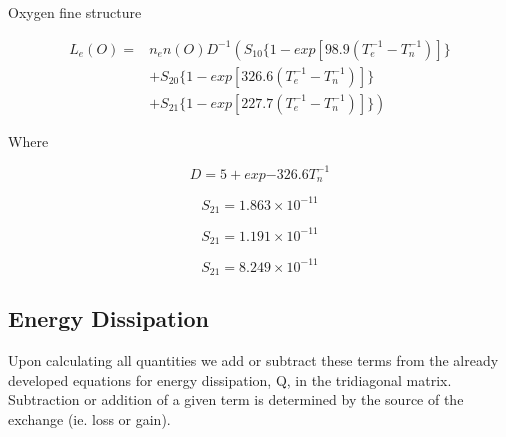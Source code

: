 \documentclass[10pt]{article}
\begin{document}
\noindent Oxygen fine structure 

\begin{equation}
\begin{split}
L_{e}(O) =& n_{e} n(O) D^{-1} \left( S_{10} \lbrace 1 - exp{[98.9(T_{e}^{-1} - T_{n}^{-1})]} \rbrace \right. \\ & \left. 
+ S_{20} \lbrace 1 - exp[326.6(T_{e}^{-1} - T_{n}^{-1})] \rbrace \right. \\ & \left. 
+ S_{21} \lbrace 1-exp[227.7(T_{e}^{-1} - T_{n}^{-1})] \rbrace \right)
\end{split}
\end{equation}

\noindent Where

\begin{equation}
D = 5 + exp{-326.6 T_{n}^{-1}}
\end{equation}

\begin{equation}
S_{21} = 1.863 \times 10^{-11}
\end{equation}

\begin{equation}
S_{21} = 1.191 \times 10^{-11}
\end{equation}

\begin{equation}
S_{21} = 8.249 \times 10^{-11}
\end{equation}

\subsection{Energy Dissipation}
Upon calculating all quantities we add or subtract these terms from the already developed equations for energy dissipation, Q, in the tridiagonal matrix. Subtraction or addition of a given term is determined by the source of the exchange (ie. loss or gain).
\end{document}
